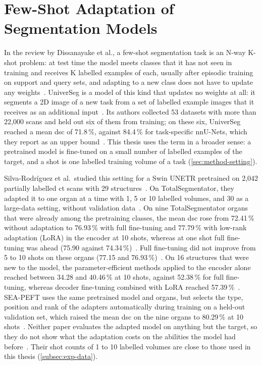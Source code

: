 \section{Few-Shot Adaptation of Segmentation Models}
\label{sec:sota-few-shot}

In the review by Dissanayake et al., a few-shot segmentation task is an N-way K-shot problem: at test time the model meets classes that it has not seen in training and receives K labelled examples of each, usually after episodic training on support and query sets, and adapting to a new class does not have to update any weights~\cite[Sec.~2.2.1]{theekshana26fewshot}.
UniverSeg is a model of this kind that updates no weights at all: it segments a 2D image of a new task from a set of labelled example images that it receives as an additional input~\cite{universeg}.
Its authors collected 53 datasets with more than 22{,}000 scans and held out six of them from training; on these six, UniverSeg reached a mean \gls{dsc} of 71.8\,\%, against 84.4\,\% for task-specific nnU-Nets, which they report as an upper bound~\cite{universeg}.
This thesis uses the term in a broader sense: a pretrained model is fine-tuned on a small number of labelled examples of the target, and a shot is one labelled training volume of a task (\cref{sec:method-setting}).

Silva-Rodríguez et al.\ studied this setting for a Swin UNETR pretrained on 2{,}042 partially labelled \gls{ct} scans with 29 structures~\cite{silvarodriguez2023fseft}.
On TotalSegmentator, they adapted it to one organ at a time with 1, 5 or 10 labelled volumes, and 30 as a large-data setting, without validation data~\cite{silvarodriguez2023fseft}.
On nine TotalSegmentator organs that were already among the pretraining classes, the mean \gls{dsc} rose from 72.41\,\% without adaptation to 76.93\,\% with full fine-tuning and 77.79\,\% with low-rank adaptation (LoRA) in the encoder at 10 shots, whereas at one shot full fine-tuning was ahead (75.90 against 74.34\,\%)~\cite{silvarodriguez2023fseft}.
Full fine-tuning did not improve from 5 to 10 shots on these organs (77.15 and 76.93\,\%)~\cite{silvarodriguez2023fseft}.
On 16 structures that were new to the model, the parameter-efficient methods applied to the encoder alone reached between 34.28 and 40.46\,\% at 10 shots, against 52.38\,\% for full fine-tuning, whereas decoder fine-tuning combined with LoRA reached 57.39\,\%~\cite{silvarodriguez2023fseft}.
SEA-PEFT uses the same pretrained model and organs, but selects the type, position and rank of the adapters automatically during training on a held-out validation set, which raised the mean \gls{dsc} on the nine organs to 80.29\,\% at 10 shots~\cite{ly2026seapeft}.
Neither paper evaluates the adapted model on anything but the target, so they do not show what the adaptation costs on the abilities the model had before~\cite{silvarodriguez2023fseft,ly2026seapeft}.
Their shot counts of 1 to 10 labelled volumes are close to those used in this thesis (\cref{subsec:exp-data}).

